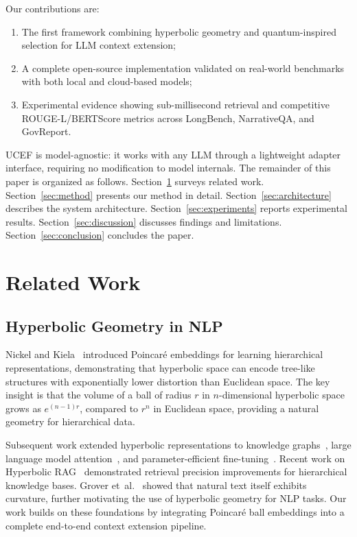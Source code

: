 \documentclass[11pt,a4paper]{article}
\newcommand{\ucef}{\textsf{UCEF}}
\begin{document}
\noindent Our contributions are:
\begin{enumerate}
  \item The first framework combining hyperbolic geometry and
    quantum-inspired selection for LLM context extension;
  \item A complete open-source implementation validated on real-world
    benchmarks with both local and cloud-based models;
  \item Experimental evidence showing sub-millisecond retrieval and
    competitive ROUGE-L/BERTScore metrics across LongBench, NarrativeQA,
    and GovReport.
\end{enumerate}

\noindent \ucef{} is model-agnostic: it works with any LLM through a
lightweight adapter interface, requiring no modification to model internals.
The remainder of this paper is organized as follows.
Section~\ref{sec:related} surveys related work.
Section~\ref{sec:method} presents our method in detail.
Section~\ref{sec:architecture} describes the system architecture.
Section~\ref{sec:experiments} reports experimental results.
Section~\ref{sec:discussion} discusses findings and limitations.
Section~\ref{sec:conclusion} concludes the paper.


\section{Related Work}
\label{sec:related}

\subsection{Hyperbolic Geometry in NLP}

Nickel and Kiela~\citep{nickel2017poincare} introduced Poincar\'{e}
embeddings for learning hierarchical representations, demonstrating that
hyperbolic space can encode tree-like structures with exponentially lower
distortion than Euclidean space.  The key insight is that the volume of a
ball of radius $r$ in $n$-dimensional hyperbolic space grows as
$e^{(n-1)r}$, compared to $r^n$ in Euclidean space, providing a natural
geometry for hierarchical data.

Subsequent work extended hyperbolic representations to knowledge
graphs~\citep{sun2024lorentz}, large language model
attention~\citep{patil2025hyperbolicllm}, and parameter-efficient
fine-tuning~\citep{bronstein2024hyplora}.  Recent work on Hyperbolic
RAG~\citep{cao2025hyperbolicrag,madhu2026hyprag} demonstrated retrieval
precision improvements for hierarchical knowledge bases.  Grover
et~al.~\citep{grover2026curvature} showed that natural text itself exhibits
curvature, further motivating the use of hyperbolic geometry for NLP tasks.
Our work builds on these foundations by integrating Poincar\'{e} ball
embeddings into a complete end-to-end context extension pipeline.
\end{document}
